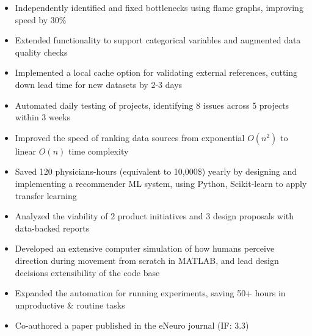 \documentclass[letterpaper]{article}
\begin{document}
\begin{itemize} \itemsep 1pt
        \item Independently identified and fixed bottlenecks using flame graphs, improving  speed by 30\%
        \item Extended functionality to support categorical variables and augmented data quality checks
        \item Implemented a local cache option for validating external references, cutting down lead time for new datasets by 2-3 days
    \item Automated daily testing of projects, identifying 8 issues across 5 projects within 3 weeks
    \item Improved the speed of ranking data sources from exponential $O(n^2)$ to linear $O(n)$ time complexity

\end{itemize}

\begin{itemize} \itemsep 1pt
    \item Saved 120 physicians-hours (equivalent to 10,000\$) yearly by designing and implementing a recommender ML system, using Python, Scikit-learn to apply transfer learning
	\item Analyzed the viability of 2 product initiatives and 3 design proposals with data-backed reports
\end{itemize}

\begin{itemize} \itemsep 1pt
	\item Developed an extensive computer simulation of how humans perceive direction during movement from scratch in MATLAB, and lead design decisions extensibility of the code base
	\item Expanded the automation for running experiments, saving 50+ hours in unproductive \& routine tasks
	\item Co-authored a paper published in the eNeuro journal (IF: 3.3)
\end{itemize}
\end{document}
